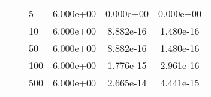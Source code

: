 \documentclass[9pt]{beamer}
\begin{document}
\begin{frame}
\begin{table}[]
{\begin{tabular}{|l|S|l|S|S|S|}
                            &   & 5     & 6.000e+00   & 0.000e+00   & 0.000e+00 \\
                            &   & 10    & 6.000e+00   & 8.882e-16   & 1.480e-16 \\
                            &   & 50    & 6.000e+00   & 8.882e-16   & 1.480e-16 \\
                            &   & 100   & 6.000e+00   & 1.776e-15   & 2.961e-16 \\
                            &   & 500   & 6.000e+00   & 2.665e-14   & 4.441e-15 \\
                \hline

            \end{tabular}

            }
        \end{table}

    \end{frame}

\end{document}
